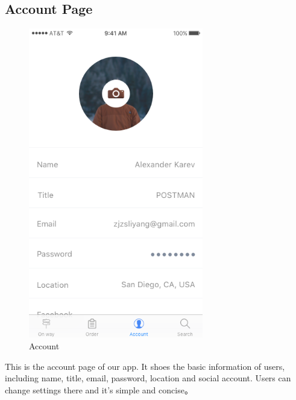 \documentclass[12pt]{scrreprt}
\begin{document}
\subsection{Account Page}
\begin{figure}[H]
  \centering\includegraphics[width=3in]{DocumentRes/Account.png}
  \caption{Account}
\end{figure}
This is the account page of our app. It shoes the basic information of users,
including name, title, email, password, location and social account. Users can
change settings there and it's simple and concise。
\end{document}

